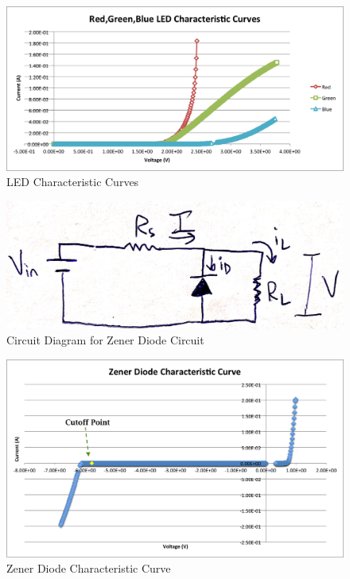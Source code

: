 \documentclass{article}
\begin{document}
    \begin{figure}[H]
        \centering
        \includegraphics[scale = 0.65]{3_13.png}
        \caption{LED Characteristic Curves}
        \label{fig:my_label}
    \end{figure}
    \begin{figure}[H]
        \centering
        \includegraphics[scale = 0.15]{IMG_0220.JPG}
        \caption{Circuit Diagram for Zener Diode Circuit}
        \label{fig:my_label}
    \end{figure}
    \begin{figure}[H]
        \centering
        \includegraphics[scale = 0.55]{3_14b.png}
        \caption{Zener Diode Characteristic Curve}
        \label{fig:my_label}
    \end{figure}
\end{document}
